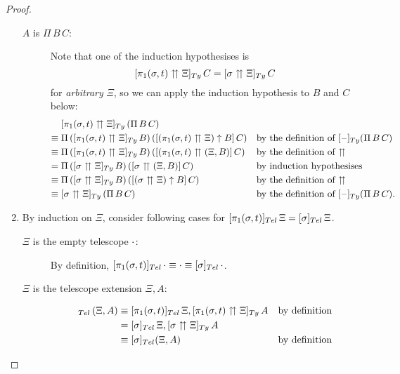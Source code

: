 \documentclass[a4paper,UKenglish,numberwithinsect,cleveref,thm-restate]{lipics-v2021}
\begin{document}
\begin{proof}
\begin{enumerate}
\begin{description}
        \item[$A$ is $\Pi\,B\,C$:]
          Note that one of the induction hypothesises is
          \[
            [\pi_1(\sigma, t) \upuparrows \Xi]_{\Ty}\,C = [\sigma \upuparrows \Xi]_{\Ty}\,C
          \]
          for \emph{arbitrary} $\Xi$, so we can apply the induction hypothesis to $B$ and $C$ below:
          \begin{align*}
            & [\pi_1(\sigma, t) \upuparrows \Xi]_{\Ty}\,(\Pi\,B\,C) \\
            \judgeq{} & \Pi\,([\pi_1(\sigma, t) \upuparrows \Xi]_{\Ty}\,B)\,([(\pi_1(\sigma, t) \upuparrows \Xi) \uparrow B]\,C) && \text{by the definition of $[\blank]_{\Ty}(\Pi\,B\,C)$} \\
            \judgeq{} & \Pi\,([\pi_1(\sigma, t) \upuparrows \Xi]_{\Ty}\,B)\,([(\pi_1(\sigma, t) \upuparrows (\Xi, B)]\,C) && \text{by the definition of $\upuparrows$} \\
            ={}       & \Pi\,([\sigma \upuparrows \Xi]_{\Ty}\,B)\,([\sigma \upuparrows (\Xi, B)]\,C) && \text{by induction hypothesises} \\
            \judgeq{} & \Pi\,([\sigma \upuparrows \Xi]_{\Ty}\,B)\,([(\sigma \upuparrows \Xi) \uparrow B]\,C) && \text{by the definition of $\upuparrows$} \\
            \judgeq{} & [\sigma\upuparrows \Xi]_{\Ty}\,(\Pi\,B\,C) && \text{by the definition of $[\blank]_{\Ty}(\Pi\,B\,C)$.}
          \end{align*}
      \end{description}
    \item By induction on $\Xi$, consider following cases for $[\pi_1(\sigma, t)]_{\Tel}\,\Xi = [\sigma]_{\Tel}\,\Xi$. 
      \begin{description}
        \item[$\Xi$ is the empty telescope $\cdot$:] By definition, $[\pi_1(\sigma, t)]_{\Tel}\,\emptytel \judgeq \emptytel \judgeq [\sigma]_{\Tel}\,\emptytel$.
        \item[$\Xi$ is the telescope extension $\Xi, A$:] 
          \begin{align*}
            [\pi_1(\sigma, t)]_{\Tel}\,(\Xi, A) & \judgeq [\pi_1(\sigma, t)]_{\Tel}\,\Xi, [\pi_1(\sigma, t) \upuparrows \Xi]_{\Ty}\,A && \text{by definition} \\
                                                & = [\sigma]_{\Tel}\,\Xi, [\sigma \upuparrows \Xi]_{\Ty}\,A \\
                                                & \judgeq [\sigma]_{\Tel}(\Xi, A) && \text{by definition}

\end{align*}
\end{description}
\end{enumerate}
\end{proof}
\end{document}
